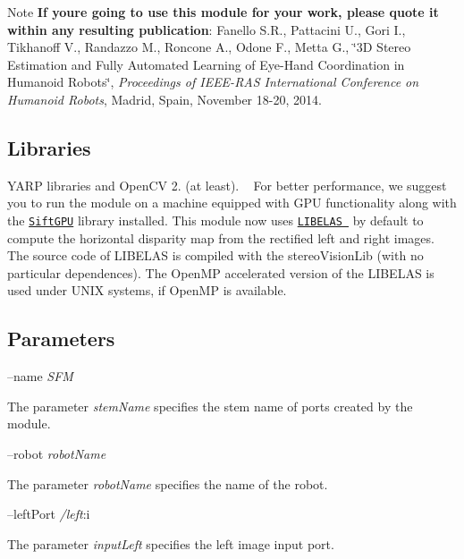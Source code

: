 \begin{DoxyNote}{Note}
{\bfseries If you\textquotesingle{}re going to use this module for your work, please quote it within any resulting publication}\+: Fanello S.\+R., Pattacini U., Gori I., Tikhanoff V., Randazzo M., Roncone A., Odone F., Metta G., \char`\"{}3\+D Stereo Estimation and Fully Automated
      Learning of Eye-\/\+Hand Coordination in Humanoid Robots\char`\"{}, {\itshape Proceedings of I\+E\+E\+E-\/\+R\+AS International Conference on Humanoid Robots}, Madrid, Spain, November 18-\/20, 2014.
\end{DoxyNote}
\hypertarget{group__SFM_lib_sec}{}\subsection{Libraries}\label{group__SFM_lib_sec}
Y\+A\+RP libraries and Open\+CV 2. (at least). ~\newline
For better performance, we suggest you to run the module on a machine equipped with G\+PU functionality along with the \href{http://cs.unc.edu/~ccwu/siftgpu}{\tt Sift\+G\+PU} library installed. This module now uses \href{http://www.cvlibs.net/software/libelas/}{\tt L\+I\+B\+E\+L\+AS } by default to compute the horizontal disparity map from the rectified left and right images. The source code of L\+I\+B\+E\+L\+AS is compiled with the stereo\+Vision\+Lib (with no particular dependences). The Open\+MP accelerated version of the L\+I\+B\+E\+L\+AS is used under U\+N\+IX systems, if Open\+MP is available.\hypertarget{group__SFM_parameters_sec}{}\subsection{Parameters}\label{group__SFM_parameters_sec}
--name {\itshape S\+FM} 
\begin{DoxyItemize}
\item The parameter {\itshape stem\+Name} specifies the stem name of ports created by the module.
\end{DoxyItemize}

--robot {\itshape robot\+Name} 
\begin{DoxyItemize}
\item The parameter {\itshape robot\+Name} specifies the name of the robot.
\end{DoxyItemize}

--left\+Port {\itshape /left}\+:i
\begin{DoxyItemize}
\item The parameter {\itshape input\+Left} specifies the left image input port.
\end{DoxyItemize}

